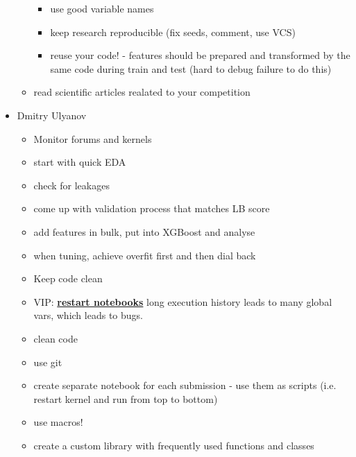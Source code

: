 \documentclass[a4paper]{report}
\begin{document}
\begin{itemize}
\begin{itemize}
      \begin{itemize}
	\item use good variable names
	\item keep research reproducible (fix seeds, comment, use VCS)
	\item reuse your code! - features should be prepared and transformed by the same code during train and test (hard to debug failure to do this)
      \end{itemize}
    \item read scientific articles realated to your competition
  \end{itemize}
\item Dmitry Ulyanov
  \begin{itemize}
    \item Monitor forums and kernels
    \item start with quick EDA
    \item check for leakages
    \item come up with validation process that matches LB score
    \item add features in bulk, put into XGBoost and analyse
    \item when tuning, achieve overfit first and then dial back
    \item Keep code clean
    \item VIP: \underline{\bf restart notebooks} long execution history leads to many global vars, which leads to bugs.
    \item clean code
    \item use git
    \item create separate notebook for each submission - use them as scripts (i.e. restart kernel and run from top to bottom)
    \item use macros!
    \item create a custom library with frequently used functions and classes
  \end{itemize}
\end{itemize}
\end{document}
